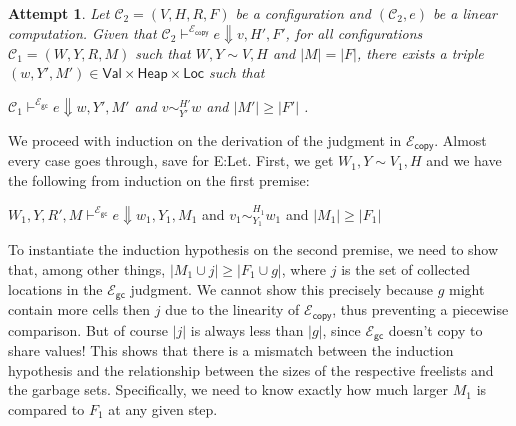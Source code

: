 \documentclass{easychair}
\newcommand{\ms}[1]{\ensuremath{\mathsf{#1}}}
\newcommand{\veq}[4]{#3 \sim^{#1}_{#2} #4}
\newcommand{\gcSem}{\ensuremath{\mathcal{E}_{\ms{gc}}}}
\newcommand{\copySem}{\ensuremath{\mathcal{E}_{\ms{copy}}}}
\newtheorem{attempt}{Attempt}
\theoremstyle{definition}
\begin{document}
\begin{attempt}
	Let $\mathcal{C}_2 = (V,H,R,F)$ be a configuration and $(\mathcal{C}_2, e)$ 
	be a linear computation. Given that 
	$\mathcal{C}_2 \vdash^{\copySem} e \Downarrow v,H',F'$, 
	for all configurations $\mathcal{C}_1 = (W,Y,R,M)$ such that $W,Y \sim V,H$ and $|M| = |F|$,
there exists a triple
$(w,Y',M') \in \ms{Val} \times \ms{Heap} \times \ms{Loc}$ such that
	\begin{center}
			$\mathcal{C}_1 \vdash^{\gcSem} e \Downarrow w,Y',M'$
		\hspace{3em} and \hspace{3em}	 $\veq{H'}{Y'}{v}{w}$
		\hspace{3em} and \hspace{3em}	 $|M'| \ge |F'|$ .
	\end{center}
\end{attempt}

We proceed with induction on the derivation of the judgment in \copySem. 
Almost every case goes through, save for E:Let. 
First, we get $W_1,Y \sim V_1,H$ and we have the following from induction on the first premise:
%
\begin{center}
	 $W_1,Y,R',M \vdash^{\gcSem} e \Downarrow w_1,Y_1,M_1$
   \hspace{3em} and \hspace{3em}	 $\veq{H_1}{Y_1}{v_1}{w_1}$
   \hspace{3em} and \hspace{3em}	 $|M_1| \ge |F_1|$
\end{center}
%
To instantiate the induction hypothesis on the second premise, we need to show that, among 
other things, $|M_1 \cup j| \ge |F_1 \cup g|$, where $j$ is the set of collected locations in 
the \gcSem{} judgment. We cannot show this precisely because $g$ might contain more cells 
then $j$ due to the linearity of \copySem{}, thus preventing a piecewise comparison. 
But of course $|j|$ is always less than $|g|$, since \gcSem{} doesn't copy to share 
values! This shows that there is a mismatch between the induction hypothesis and the relationship
between the sizes of the respective freelists and the garbage sets. Specifically, we need to
know exactly how much larger $M_1$ is compared to $F_1$ at any given step. 
\end{document}
